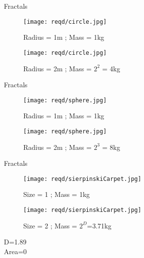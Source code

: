 \documentclass{beamer}
\begin{document}
\begin{frame}{Fractals}
	\begin{figure}
    		\centering
    		\begin{minipage}{0.5\textwidth}
        		\centering
        		\texttt{[image: reqd/circle.jpg]}
        		\caption*{Radius = 1m ; Mass = 1kg}
        	\end{minipage}\hfill
        	\pause
        	\begin{minipage}{0.5\textwidth}
        		\centering
        		\texttt{[image: reqd/circle.jpg]}
        		\caption*{Radius = 2m ; Mass = $2^2$ = 4kg}
        	\end{minipage}
	\end{figure}
\end{frame}

\begin{frame}{Fractals}
	\begin{figure}
    		\centering
    		\begin{minipage}{0.5\textwidth}
        		\centering
        		\texttt{[image: reqd/sphere.jpg]}
        		\caption*{Radius = 1m ; Mass = 1kg}
        	\end{minipage}\hfill
        	\pause
        	\begin{minipage}{0.5\textwidth}
        		\centering
        		\texttt{[image: reqd/sphere.jpg]}
        		\caption*{Radius = 2m ; Mass = $2^3$ = 8kg}
        	\end{minipage}
	\end{figure}
\end{frame}

\begin{frame}{Fractals}
	\begin{figure}
    		\centering
    		\begin{minipage}{0.5\textwidth}
        		\centering
        		\texttt{[image: reqd/sierpinskiCarpet.jpg]}
        		\caption{Size = 1 ; Mass = 1kg}
        	\end{minipage}\hfill
        	\pause
        	\begin{minipage}{0.5\textwidth}
        		\centering
        		\texttt{[image: reqd/sierpinskiCarpet.jpg]}
        		\caption{Size = 2 ; Mass = $2^D$=3.71kg}
        	\end{minipage}
	\end{figure}
	\vspace{1em}
	\pause
	\centering
	D=1.89\\
	\pause
	Area=0
\end{frame}
\end{document}
